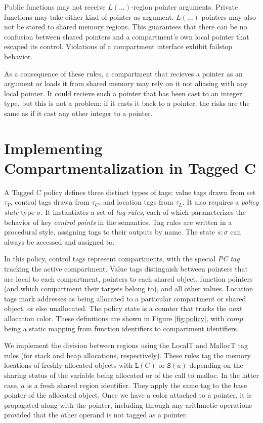 \documentclass{article}
\begin{document}
Public functions may not receive \(L(\dots)\)-region pointer arguments.
Private functions may take either kind of pointer as argument. \(L(\dots)\) pointers
may also not be stored to shared memory regions. This guarantees that there can be no
confusion between shared pointers and a compartment's own local pointer that
escaped its control. Violations of a compartment interface exhibit failstop behavior.

As a consequence of these rules, a compartment that recieves a pointer as an argument
or loads it from shared memory may rely on it not aliasing with any local pointer.
It could recieve such a pointer that has been cast to an integer type, but this is
not a problem: if it casts it back to a pointer, the risks are the same as if it
cast any other integer to a pointer.

\section{Implementing Compartmentalization in Tagged C}

A Tagged C policy defines three distinct types of tags: value tags 
drawn from set \(\tau_V\), control tags drawn from \(\tau_C\), and location tags
from \(\tau_L\). It also requires a {\it policy state} type \(\sigma\).
It instantiates a set of {\it tag rules}, each of which parameterizes the behavior
of key {\it control points} in the semantics. Tag rules are written in a procedural style,
assigning tags to their outputs by name. The state \(s : \sigma\) can always be accessed
and assigned to.

In this policy, control tags represent compartments, with the special {\it PC tag}
tracking the active compartment. Value tags distinguish between pointers that are local
to each compartment, pointers to each shared object, function pointers
(and which compartment their targets belong to), and all other values.
Location tags mark addresses as being allocated to a particular compartment or shared object, or
else unallocated. The policy state is a counter that tracks the next allocation color.
These definitions are shown in Figure \ref{fig:policy}, with \(\mathit{comp}\) being a
static mapping from function identifiers to compartment identifiers.


We implement the division between regions using the LocalT and MallocT tag rules
(for stack and heap allocations, respectively). These rules tag the memory locations
of freshly allocated objects with \(\mathtt{L}(C)\) or \(\mathtt{S}(a)\) depending
on the sharing status of the variable being allocated or of the call to malloc.
In the latter case, \(a\) is a fresh shared region identifier.
They apply the same tag to the base pointer of the allocated object.
Once we have a color attached to a pointer, it is propagated along
with the pointer, including through any arithmetic operations provided that the other operand
is not tagged as a pointer.
\end{document}
